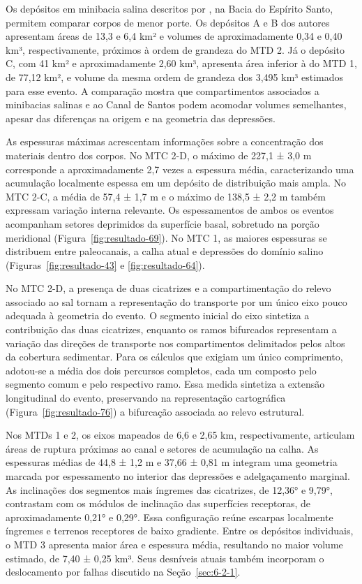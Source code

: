 Os depósitos em minibacia salina descritos por , na Bacia do Espírito Santo, permitem comparar corpos de menor porte. Os depósitos A e B dos autores apresentam áreas de 13,3 e 6,4 km² e volumes de aproximadamente 0,34 e 0,40 km³, respectivamente, próximos à ordem de grandeza do MTD 2. Já o depósito C, com 41 km² e aproximadamente 2,60 km³, apresenta área inferior à do MTD 1, de 77,12 km², e volume da mesma ordem de grandeza dos 3,495 km³ estimados para esse evento. A comparação mostra que compartimentos associados a minibacias salinas e ao Canal de Santos podem acomodar volumes semelhantes, apesar das diferenças na origem e na geometria das depressões.

As espessuras máximas acrescentam informações sobre a concentração dos materiais dentro dos corpos. No MTC 2-D, o máximo de 227,1 ± 3,0 m corresponde a aproximadamente 2,7 vezes a espessura média, caracterizando uma acumulação localmente espessa em um depósito de distribuição mais ampla. No MTC 2-C, a média de 57,4 ± 1,7 m e o máximo de 138,5 ± 2,2 m também expressam variação interna relevante. Os espessamentos de ambos os eventos acompanham setores deprimidos da superfície basal, sobretudo na porção meridional (Figura~\ref{fig:resultado-69}). No MTC 1, as maiores espessuras se distribuem entre paleocanais, a calha atual e depressões do domínio salino (Figuras~\ref{fig:resultado-43} e \ref{fig:resultado-64}).

No MTC 2-D, a presença de duas cicatrizes e a compartimentação do relevo associado ao sal tornam a representação do transporte por um único eixo pouco adequada à geometria do evento. O segmento inicial do eixo sintetiza a contribuição das duas cicatrizes, enquanto os ramos bifurcados representam a variação das direções de transporte nos compartimentos delimitados pelos altos da cobertura sedimentar. Para os cálculos que exigiam um único comprimento, adotou-se a média dos dois percursos completos, cada um composto pelo segmento comum e pelo respectivo ramo. Essa medida sintetiza a extensão longitudinal do evento, preservando na representação cartográfica (Figura~\ref{fig:resultado-76}) a bifurcação associada ao relevo estrutural.

Nos MTDs 1 e 2, os eixos mapeados de 6,6 e 2,65 km, respectivamente, articulam áreas de ruptura próximas ao canal e setores de acumulação na calha. As espessuras médias de 44,8 ± 1,2 m e 37,66 ± 0,81 m integram uma geometria marcada por espessamento no interior das depressões e adelgaçamento marginal. As inclinações dos segmentos mais íngremes das cicatrizes, de 12,36° e 9,79°, contrastam com os módulos de inclinação das superfícies receptoras, de aproximadamente 0,21° e 0,29°. Essa configuração reúne escarpas localmente íngremes e terrenos receptores de baixo gradiente. Entre os depósitos individuais, o MTD 3 apresenta maior área e espessura média, resultando no maior volume estimado, de 7,40 ± 0,25 km³. Seus desníveis atuais também incorporam o deslocamento por falhas discutido na Seção~\ref{sec:6-2-1}.

